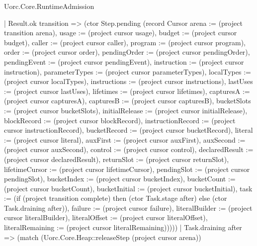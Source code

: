 \begin{lexlean}{Uorc.Core.RuntimeAdmission}
\begin{semanticmodule}
{      | Result.ok transition => (ctor Step.pending (record Cursor {arena := (project transition arena), usage := (project cursor usage), budget := (project cursor budget), caller := (project cursor caller), program := (project cursor program), order := (project cursor order), pendingOrder := (project cursor pendingOrder), pendingEvent := (project cursor pendingEvent), instruction := (project cursor instruction), parameterTypes := (project cursor parameterTypes), localTypes := (project cursor localTypes), instructions := (project cursor instructions), lastUses := (project cursor lastUses), lifetimes := (project cursor lifetimes), capturesA := (project cursor capturesA), capturesB := (project cursor capturesB), bucketSlots := (project cursor bucketSlots), initialRelease := (project cursor initialRelease), blockRecord := (project cursor blockRecord), instructionRecord := (project cursor instructionRecord), bucketRecord := (project cursor bucketRecord), literal := (project cursor literal), auxFirst := (project cursor auxFirst), auxSecond := (project cursor auxSecond), control := (project cursor control), declaredResult := (project cursor declaredResult), returnSlot := (project cursor returnSlot), lifetimeCursor := (project cursor lifetimeCursor), pendingSlot := (project cursor pendingSlot), bucketIndex := (project cursor bucketIndex), bucketCount := (project cursor bucketCount), bucketInitial := (project cursor bucketInitial), task := (if (project transition complete) then (ctor Task.stage after) else (ctor Task.draining after)), failure := (project cursor failure), literalBuilder := (project cursor literalBuilder), literalOffset := (project cursor literalOffset), literalRemaining := (project cursor literalRemaining)}))))
    | Task.draining after => (match (Uorc.Core.Heap::releaseStep (project cursor arena))
}
\end{semanticmodule}
\end{lexlean}
